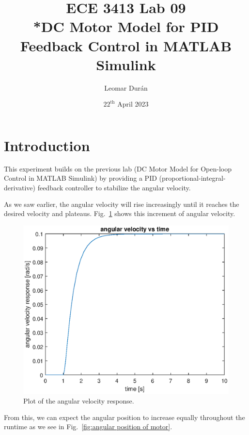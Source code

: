 \documentclass[12pt]{article}
\title{ECE 3413 Lab 09\\*DC Motor Model for PID Feedback Control in MATLAB Simulink}
\author{Leomar Dur\'an}
\date{${22}^{\text{th}}$ April 2023}
\begin{document}
\maketitle
\newpage

\section{Introduction}

This experiment builds on the previous lab (DC Motor Model for Open-loop Control in MATLAB Simulink) by providing a PID (proportional-integral-derivative) feedback controller to stabilize the angular velocity.

As we saw earlier, the angular velocity will rise increasingly until it reaches the desired velocity and plateaus. Fig.~\ref{fig:plot of angular velocity} shows this increment of angular velocity.

\begin{figure}
    \centering
    \includegraphics[width=\linewidth]{img/task02_plot_angular_velocity.eps}
    \caption{Plot of the angular velocity response.}
    \label{fig:plot of angular velocity}
\end{figure}

From this, we can expect the angular position to increase equally throughout the runtime as we see in Fig.~\ref{fig:angular position of motor}.
\end{document}
